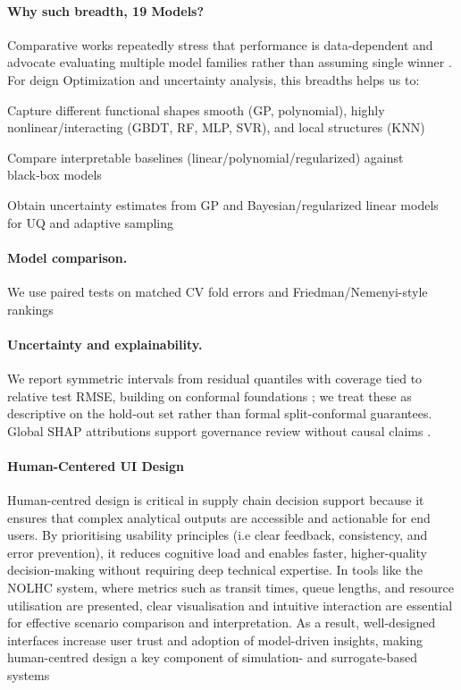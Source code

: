 \documentclass[12pt,twocolumn,a4paper]{article}
\theoremstyle{plain}
\theoremstyle{definition}
\theoremstyle{remark}
\begin{document}
 \paragraph{Why such breadth, 19 Models?}
Comparative works repeatedly stress that performance is data-dependent and advocate evaluating multiple model families rather than assuming single winner \citep{Preethi2025, marrel2024, chen2016xgboost, bogoclu2021}. For deign Optimization and uncertainty analysis, this breadths helps us to:
\item Capture different functional shapes smooth (GP, polynomial), highly nonlinear/interacting (GBDT, RF, MLP, SVR), and local structures (KNN) \citep{marrel2024, Bentejac2024,Cheng2017}
\item Compare interpretable baselines (linear/polynomial/regularized) against black‑box models \citep{Preethi2025, marrel2024}
\item Obtain uncertainty estimates from GP and Bayesian/regularized linear models for UQ and adaptive sampling \citep{Manfredi2024, Jin2020, tay2021,Bedoui2020}

\paragraph{Model comparison.}
We use paired tests on matched CV fold errors and Friedman/Nemenyi-style rankings 
\paragraph{Uncertainty and explainability.}
We report symmetric intervals from residual quantiles with coverage tied to relative test RMSE, building on conformal foundations \citep{vovk2005algorithmic}; we treat these as descriptive on the hold-out set rather than formal split-conformal guarantees.
Global SHAP attributions support governance review without causal claims \citep{lundberg2017shap}.

\paragraph{Human-Centered UI Design}
Human-centred design is critical in supply chain decision support because it ensures that complex analytical outputs are accessible and actionable for end users. By prioritising usability principles (i.e clear feedback, consistency, and error prevention), it reduces cognitive load and enables faster, higher-quality decision-making without requiring deep technical expertise. In tools like the NOLHC system, where metrics such as transit times, queue lengths, and resource utilisation are presented, clear visualisation and intuitive interaction are essential for effective scenario comparison and interpretation. As a result, well-designed interfaces increase user trust and adoption of model-driven insights, making human-centred design a key component of simulation- and surrogate-based systems \citep{viana2016}
\end{document}
